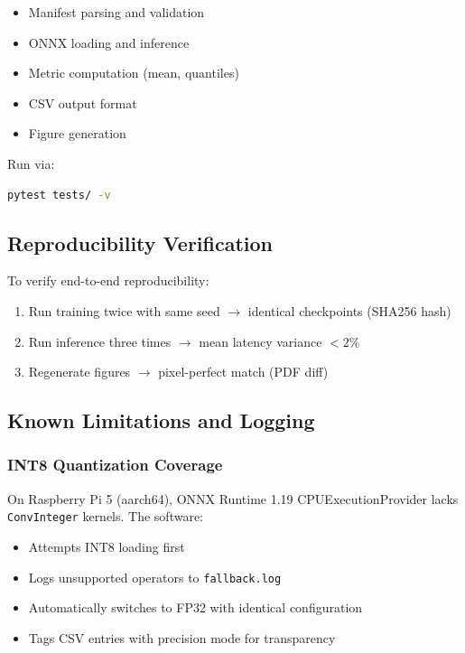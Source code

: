 \documentclass[review]{elsarticle}
\begin{document}
\begin{itemize}
\item Manifest parsing and validation
\item ONNX loading and inference
\item Metric computation (mean, quantiles)
\item CSV output format
\item Figure generation
\end{itemize}

Run via:

\begin{lstlisting}[language=bash]
pytest tests/ -v
\end{lstlisting}

\subsection{Reproducibility Verification}

To verify end-to-end reproducibility:

\begin{enumerate}
\item Run training twice with same seed $\rightarrow$ identical checkpoints (SHA256 hash)
\item Run inference three times $\rightarrow$ mean latency variance $< 2\%$
\item Regenerate figures $\rightarrow$ pixel-perfect match (PDF diff)
\end{enumerate}

\subsection{Known Limitations and Logging}

\subsubsection{INT8 Quantization Coverage}

On Raspberry Pi 5 (aarch64), ONNX Runtime 1.19 CPUExecutionProvider lacks \texttt{ConvInteger} kernels. The software:

\begin{itemize}
\item Attempts INT8 loading first
\item Logs unsupported operators to \texttt{fallback.log}
\item Automatically switches to FP32 with identical configuration
\item Tags CSV entries with precision mode for transparency
\end{itemize}
\end{document}
